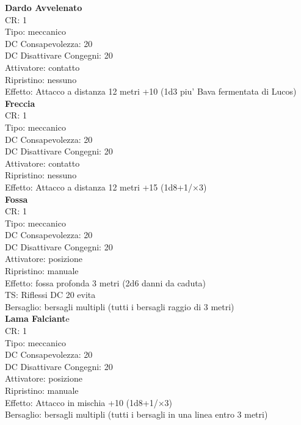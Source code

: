 \documentclass[a4paper,11pt,twoside,openany]{dndbook}
\begin{document}
\begin{multicols}{2}
	
\textbf{Dardo Avvelenato}\\
CR: 1 \\
Tipo: meccanico \\
DC Consapevolezza: 20 \\
DC Disattivare Congegni: 20 \\
Attivatore: contatto \\
Ripristino: nessuno \\
Effetto: Attacco a distanza 12 metri +10 (1d3 piu' Bava fermentata di Lucos)\\

\textbf{Freccia}\\
CR: 1 \\
Tipo: meccanico \\
DC Consapevolezza: 20 \\
DC Disattivare Congegni: 20 \\
Attivatore: contatto \\
Ripristino: nessuno \\
Effetto: Attacco a distanza 12 metri +15 (1d8+1/×3)\\

\textbf{Fossa}\\
CR: 1 \\
Tipo: meccanico \\
DC Consapevolezza: 20 \\
DC Disattivare Congegni: 20 \\
Attivatore: posizione \\
Ripristino: manuale \\
Effetto: fossa profonda 3 metri (2d6 danni da caduta) \\
TS: Riflessi DC 20 evita \\
Bersaglio: bersagli multipli (tutti i bersagli raggio di 3 metri)\\

\textbf{Lama Falciant}e\\
CR: 1 \\
Tipo: meccanico \\
DC Consapevolezza: 20 \\
DC Disattivare Congegni: 20 \\
Attivatore: posizione \\
Ripristino: manuale \\
Effetto: Attacco in mischia +10 (1d8+1/×3) \\
Bersaglio: bersagli multipli (tutti i bersagli in una linea entro 3 metri)\\


\end{multicols}
\end{document}
